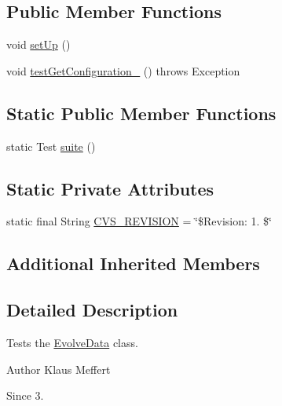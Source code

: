 \subsection*{Public Member Functions}
\begin{DoxyCompactItemize}
\item 
void \hyperlink{classorg_1_1jgap_1_1impl_1_1job_1_1_evolve_data_test_a52274caf0a5fed038d1b5c62b9d9504d}{set\-Up} ()
\item 
void \hyperlink{classorg_1_1jgap_1_1impl_1_1job_1_1_evolve_data_test_a867f878b5ef2b36c55d487490dfcdfee}{test\-Get\-Configuration\-\_} ()  throws Exception 
\end{DoxyCompactItemize}
\subsection*{Static Public Member Functions}
\begin{DoxyCompactItemize}
\item 
static Test \hyperlink{classorg_1_1jgap_1_1impl_1_1job_1_1_evolve_data_test_a720c76531102f98dbc73c7a477eca875}{suite} ()
\end{DoxyCompactItemize}
\subsection*{Static Private Attributes}
\begin{DoxyCompactItemize}
\item 
static final String \hyperlink{classorg_1_1jgap_1_1impl_1_1job_1_1_evolve_data_test_a7222b23700f679f30b4c7cb08517c9c6}{C\-V\-S\-\_\-\-R\-E\-V\-I\-S\-I\-O\-N} = \char`\"{}\$Revision\-: 1. \$\char`\"{}
\end{DoxyCompactItemize}
\subsection*{Additional Inherited Members}


\subsection{Detailed Description}
Tests the \hyperlink{classorg_1_1jgap_1_1impl_1_1job_1_1_evolve_data}{Evolve\-Data} class.

\begin{DoxyAuthor}{Author}
Klaus Meffert 
\end{DoxyAuthor}
\begin{DoxySince}{Since}
3. 
\end{DoxySince}


